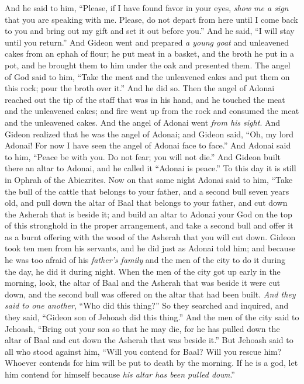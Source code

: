 \begin{biblechapter}
\verse And he said to him, “Please, if I have found favor in your eyes, \textit{show me a sign} that you are speaking with me.
\verse Please, do not depart from here until I come back to you and bring out my gift and set it out before you.” And he said, “I will stay until you return.”
\verse And Gideon went and prepared \textit{a young goat} and unleavened cakes from an ephah of flour; he put meat in a basket, and the broth he put in a pot, and he brought them to him under the oak and presented them.
\verse The angel of God said to him, “Take the meat and the unleavened cakes and put them on this rock; pour the broth over it.” And he did so.
\verse Then the angel of Adonai reached out the tip of the staff that was in his hand, and he touched the meat and the unleavened cakes; and fire went up from the rock and consumed the meat and the unleavened cakes. And the angel of Adonai went \textit{from his sight}.
\verse And Gideon realized that he was the angel of Adonai; and Gideon said, “Oh, my lord Adonai! For now I have seen the angel of Adonai face to face.”
\verse And Adonai said to him, “Peace be with you. Do not fear; you will not die.”
\verse And Gideon built there an altar to Adonai, and he called it “Adonai is peace.” To this day it is still in Ophrah of the Abiezrites.
\verse Now on that same night Adonai said to him, “Take the bull of the cattle that belongs to your father, and a second bull seven years old, and pull down the altar of Baal that belongs to your father, and cut down the Asherah that is beside it;
\verse and build an altar to Adonai your God on the top of this stronghold in the proper arrangement, and take a second bull and offer it as a burnt offering with the wood of the Asherah that you will cut down.
\verse Gideon took ten men from his servants, and he did just as Adonai told him; and because he was too afraid of his \textit{father’s family} and the men of the city to do it during the day, he did it during night.
 When the men of the city got up early in the morning, look, the altar of Baal and the Asherah that was beside it were cut down, and the second bull was offered on the altar that had been built.
\verse \textit{And they said to one another}, “Who did this thing?” So they searched and inquired, and they said, “Gideon son of Jehoash did this thing.”
\verse And the men of the city said to Jehoash, “Bring out your son so that he may die, for he has pulled down the altar of Baal and cut down the Asherah that was beside it.”
\verse But Jehoash said to all who stood against him, “Will you contend for Baal? Will you rescue him? Whoever contends for him will be put to death by the morning. If he is a god, let him contend for himself because \textit{his altar has been pulled down}.”

\end{biblechapter}
